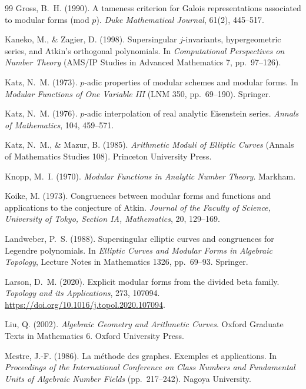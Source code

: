 \documentclass[11pt,a4paper]{article}
\numberwithin{equation}{section}
\theoremstyle{definition}
\theoremstyle{remark}
\begin{document}
\begin{thebibliography}{99}
 Gross, B.~H. (1990). A tameness criterion for Galois representations associated to modular forms (mod $p$). \emph{Duke Mathematical Journal}, 61(2), 445--517.

 Kaneko, M., \& Zagier, D. (1998). Supersingular $j$-invariants,
hypergeometric series, and Atkin's orthogonal polynomials. In \emph{Computational Perspectives on Number
Theory} (AMS/IP Studies in Advanced Mathematics 7, pp.~97--126).

 Katz, N.~M. (1973). $p$-adic properties of modular schemes and modular forms.
In \emph{Modular Functions of One Variable III} (LNM 350, pp.~69--190). Springer.

 Katz, N.~M. (1976). $p$-adic interpolation of real analytic Eisenstein series. \emph{Annals of Mathematics}, 104, 459--571.

 Katz, N.~M., \& Mazur, B. (1985). \emph{Arithmetic Moduli of Elliptic
Curves} (Annals of Mathematics Studies 108). Princeton University Press.

 Knopp, M.~I. (1970). \emph{Modular Functions in Analytic Number Theory}. Markham.

 Koike, M. (1973). Congruences between modular forms
and functions and applications to the conjecture of Atkin.
\emph{Journal of the Faculty of Science, University of Tokyo, Section IA, Mathematics},
20, 129--169.

 Landweber, P.~S. (1988). Supersingular elliptic curves and congruences for Legendre polynomials. In \emph{Elliptic Curves and Modular Forms in Algebraic Topology}, Lecture Notes in Mathematics 1326, pp.~69--93. Springer.

 Larson, D.~M. (2020). Explicit modular forms from the divided beta family. \emph{Topology and its Applications}, 273, 107094. \url{https://doi.org/10.1016/j.topol.2020.107094}.

 Liu, Q. (2002). \emph{Algebraic Geometry and Arithmetic Curves}. Oxford Graduate Texts in Mathematics 6. Oxford University Press.

 Mestre, J.-F. (1986). La m\'ethode des graphes. Exemples et applications.
In \emph{Proceedings of the International Conference on Class Numbers and Fundamental Units of Algebraic
Number Fields} (pp.~217--242). Nagoya University.


\end{thebibliography}
\end{document}
